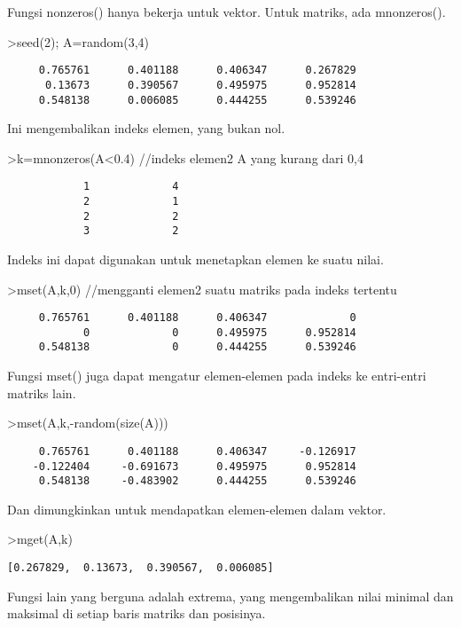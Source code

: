 \documentclass[
]{book}
\begin{document}
Fungsi nonzeros() hanya bekerja untuk vektor. Untuk matriks, ada mnonzeros().

\textgreater seed(2); A=random(3,4)

\begin{verbatim}
     0.765761      0.401188      0.406347      0.267829 
      0.13673      0.390567      0.495975      0.952814 
     0.548138      0.006085      0.444255      0.539246 
\end{verbatim}

Ini mengembalikan indeks elemen, yang bukan nol.

\textgreater k=mnonzeros(A\textless0.4) //indeks elemen2 A yang kurang dari 0,4

\begin{verbatim}
            1             4 
            2             1 
            2             2 
            3             2 
\end{verbatim}

Indeks ini dapat digunakan untuk menetapkan elemen ke suatu nilai.

\textgreater mset(A,k,0) //mengganti elemen2 suatu matriks pada indeks tertentu

\begin{verbatim}
     0.765761      0.401188      0.406347             0 
            0             0      0.495975      0.952814 
     0.548138             0      0.444255      0.539246 
\end{verbatim}

Fungsi mset() juga dapat mengatur elemen-elemen pada indeks ke entri-entri matriks lain.

\textgreater mset(A,k,-random(size(A)))

\begin{verbatim}
     0.765761      0.401188      0.406347     -0.126917 
    -0.122404     -0.691673      0.495975      0.952814 
     0.548138     -0.483902      0.444255      0.539246 
\end{verbatim}

Dan dimungkinkan untuk mendapatkan elemen-elemen dalam vektor.

\textgreater mget(A,k)

\begin{verbatim}
[0.267829,  0.13673,  0.390567,  0.006085]
\end{verbatim}

Fungsi lain yang berguna adalah extrema, yang mengembalikan nilai minimal dan maksimal di setiap baris matriks dan posisinya.
\end{document}
